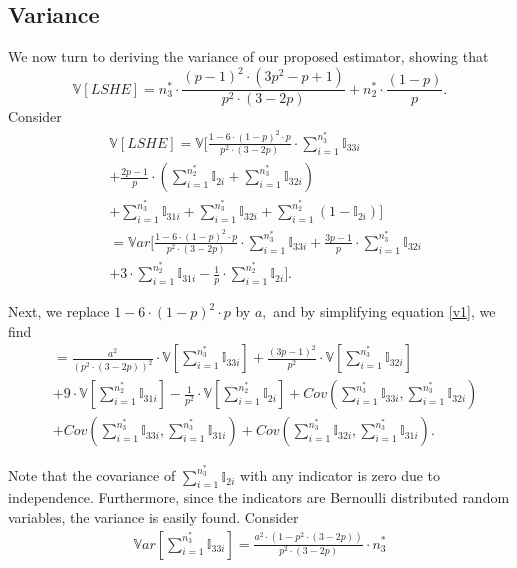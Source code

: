 \documentclass[aoas]{imsart}
\begin{document}
\subsection{Variance}
We now turn to deriving the variance of our proposed estimator, showing that
$$\mathbb{V}[LSHE] = n_3^* \cdot \frac{(p-1)^2 \cdot (3p^2-p+1)}{p^2 \cdot (3-2p)} + n_2^* \cdot \frac{(1-p)}{p}.$$
Consider
\begin{equation}
\label{v1}
\begin{split}
&\mathbb{V}[LSHE]=
\mathbb{V}[\frac{1-6 \cdot (1-p)^2 \cdot p}{p^2 \cdot (3-2p) } \cdot \sum_{i=1}^{n_3^*}{\mathbb{I}_{33i}}\\
&+
\frac{2p-1}{p} \cdot
(\sum_{i=1}^{n_2^*}{\mathbb{I}_{2i}}
+
\sum_{i=1}^{n_3^*}{\mathbb{I}_{32i}})\\
&+
\sum_{i=1}^{n_3^*}{\mathbb{I}_{31i}}
+
\sum_{i=1}^{n_3^*}{\mathbb{I}_{32i}}
+
\sum_{i=1}^{n_2^*}{(1-\mathbb{I}_{2i})}]\\
&=
\mathbb{V}ar[\frac{1-6 \cdot (1-p)^2 \cdot p}{p^2 \cdot (3-2p) } \cdot \sum_{i=1}^{n_3^*}{\mathbb{I}_{33i}}
+
\frac{3p-1}{p} \cdot
\sum_{i=1}^{n_3^*}{\mathbb{I}_{32i}}\\
&+
3 \cdot
\sum_{i=1}^{n_2^*}{\mathbb{I}_{31i}}
-
\frac{1}{p} \cdot
\sum_{i=1}^{n_2^*}{\mathbb{I}_{2i}}].
\end{split}
\end{equation}

Next, we replace $1-6 \cdot (1-p)^2 \cdot p$ by $a,$ and by simplifying equation \ref{v1},
we find
\begin{equation}
\begin{split}
&=
\frac{a^2}{(p^2 \cdot (3-2p))^2 } \cdot \mathbb{V}[\sum_{i=1}^{n_3^*}{\mathbb{I}_{33i}}]
 +
\frac{(3p-1)^2}{p^2} \cdot
\mathbb{V}[\sum_{i=1}^{n_3^*}{\mathbb{I}_{32i}}]\\
&+
9 \cdot
\mathbb{V}[\sum_{i=1}^{n_2^*}{\mathbb{I}_{31i}}]
-
\frac{1}{p^2} \cdot
\mathbb{V}[\sum_{i=1}^{n_2^*}{\mathbb{I}_{2i}}]
+
Cov(\sum_{i=1}^{n_3^*}{\mathbb{I}_{33i}}, \sum_{i=1}^{n_3^*}{\mathbb{I}_{32i}})\\
&+
Cov(\sum_{i=1}^{n_3^*}{\mathbb{I}_{33i}}, \sum_{i=1}^{n_3^*}{\mathbb{I}_{31i}})
+
Cov(\sum_{i=1}^{n_3^*}{\mathbb{I}_{32i}}, \sum_{i=1}^{n_3^*}{\mathbb{I}_{31i}}).
\end{split}
\end{equation}

Note that the covariance of $\sum_{i=1}^{n_3^*}{\mathbb{I}_{2i}}$ with any indicator is zero due to independence.
Furthermore, since the indicators are Bernoulli distributed random variables, the variance is easily found. Consider
\begin{equation}
\label{v4}
\begin{split}
\mathbb{V}ar[\sum_{i=1}^{n_3^*}{\mathbb{I}_{33i}}]
=  \frac{a^2 \cdot (1-p^2 \cdot (3-2p))}{p^2 \cdot (3-2p) } \cdot n_3^*
\end{split}
\end{equation}
\end{document}
